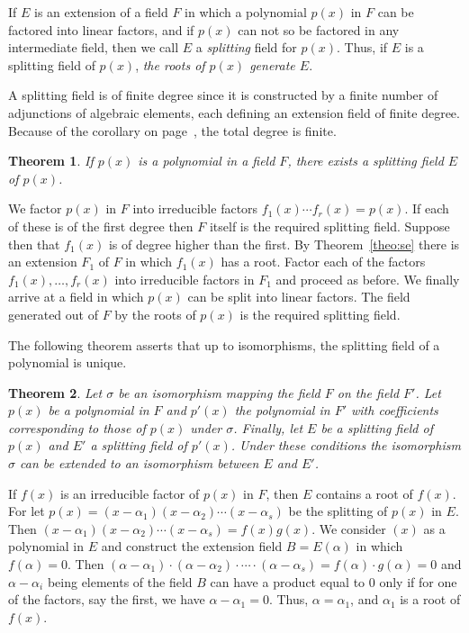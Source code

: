 \documentclass[11pt]{article}
\newtheorem{theo}{Theorem}
\theoremstyle{definition}
\begin{document}
If $E$ is an extension of a field $F$ in which a polynomial $p(x)$ in $F$ can be factored into linear factors, and if $p(x)$ can not so be factored in any intermediate field, then we call $E$ a \emph{splitting} field for $p(x)$.
Thus, if $E$ is a splitting field of $p(x)$, \emph{the roots of $p(x)$ generate $E$}.

A splitting field is of finite degree since it is constructed by a finite number of adjunctions of algebraic elements, each defining an extension field of finite degree.
Because of the corollary on page~\pageref{coro:p22}, the total degree is finite.

\begin{theo}
\label{theo:ni}
If $p(x)$ is a polynomial in a field $F$, there exists a splitting field $E$ of $p(x)$.
\end{theo}

We factor $p(x)$ in $F$ into irreducible factors $f_1(x) \cdots f_r(x) = p(x)$.
If each of these is of the first degree then $F$ itself is the required splitting field.
Suppose then that $f_1(x)$ is of degree higher than the first.
By Theorem~\ref{theo:se} there is an extension $F_1$ of $F$ in which $f_1(x)$ has a root.
Factor each of the factors $f_1(x), \ldots, f_r(x)$ into irreducible factors in $F_1$ and proceed as before.
We finally arrive at a field in which $p(x)$ can be split into linear factors.
The field generated out of $F$ by the roots of $p(x)$ is the required splitting field.

The following theorem asserts that up to isomorphisms, the splitting field of a polynomial is unique.

\begin{theo}
\label{theo:onze}
Let $\sigma$ be an isomorphism mapping the field $F$ on the field $F'$.
Let $p(x)$ be a polynomial in $F$ and $p'(x)$ the polynomial in $F'$ with coefficients corresponding to those of $p(x)$ under $\sigma$.
Finally, let $E$ be a splitting field of $p(x)$ and $E'$ a splitting field of $p'(x)$.
Under these conditions the isomorphism $\sigma$ can be extended to an isomorphism between $E$ and $E'$.
\end{theo}

If $f(x)$ is an irreducible factor of $p(x)$ in $F$, then $E$ contains a root of $f(x)$.
For let $p(x) = (x - \alpha_1) (x - \alpha_2) \cdots (x - \alpha_s)$ be the splitting of $p(x)$ in $E$.
Then $(x - \alpha_1) (x - \alpha_2) \cdots (x - \alpha_s) = f(x) g(x)$.
We consider $(x)$ as a polynomial in $E$ and construct the extension field $B = E(\alpha)$ in which $f(\alpha) = 0$.
Then $(\alpha - \alpha_1) \cdot (\alpha - \alpha_2) \cdot \cdots \cdot (\alpha - \alpha_s) = f(\alpha) \cdot g(\alpha) = 0$ and $\alpha - \alpha_i$ being elements of the field $B$ can have a product equal to $0$ only if for one of the factors, say the first, we have $\alpha - \alpha_1 = 0$.
Thus, $\alpha = \alpha_1$, and $\alpha_1$ is a root of $f(x)$.
\end{document}
